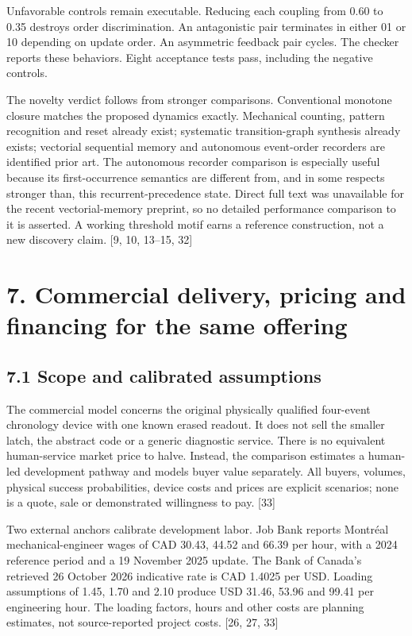 \documentclass[
  11pt,
]{article}
\begin{document}
Unfavorable controls remain executable. Reducing each coupling from 0.60
to 0.35 destroys order discrimination. An antagonistic pair terminates
in either 01 or 10 depending on update order. An asymmetric feedback
pair cycles. The checker reports these behaviors. Eight acceptance tests
pass, including the negative controls.

The novelty verdict follows from stronger comparisons. Conventional
monotone closure matches the proposed dynamics exactly. Mechanical
counting, pattern recognition and reset already exist; systematic
transition-graph synthesis already exists; vectorial sequential memory
and autonomous event-order recorders are identified prior art. The
autonomous recorder comparison is especially useful because its
first-occurrence semantics are different from, and in some respects
stronger than, this recurrent-precedence state. Direct full text was
unavailable for the recent vectorial-memory preprint, so no detailed
performance comparison to it is asserted. A working threshold motif
earns a reference construction, not a new discovery claim. {[}9, 10,
13--15, 32{]}

\hypertarget{commercial-delivery-pricing-and-financing-for-the-same-offering}{%
\section{7. Commercial delivery, pricing and financing for the same
offering}\label{commercial-delivery-pricing-and-financing-for-the-same-offering}}

\hypertarget{scope-and-calibrated-assumptions}{%
\subsection{7.1 Scope and calibrated
assumptions}\label{scope-and-calibrated-assumptions}}

The commercial model concerns the original physically qualified
four-event chronology device with one known erased readout. It does not
sell the smaller latch, the abstract code or a generic diagnostic
service. There is no equivalent human-service market price to halve.
Instead, the comparison estimates a human-led development pathway and
models buyer value separately. All buyers, volumes, physical success
probabilities, device costs and prices are explicit scenarios; none is a
quote, sale or demonstrated willingness to pay. {[}33{]}

Two external anchors calibrate development labor. Job Bank reports
Montréal mechanical-engineer wages of CAD 30.43, 44.52 and 66.39 per
hour, with a 2024 reference period and a 19 November 2025 update. The
Bank of Canada's retrieved 26 October 2026 indicative rate is CAD 1.4025
per USD. Loading assumptions of 1.45, 1.70 and 2.10 produce USD 31.46,
53.96 and 99.41 per engineering hour. The loading factors, hours and
other costs are planning estimates, not source-reported project costs.
{[}26, 27, 33{]}
\end{document}

